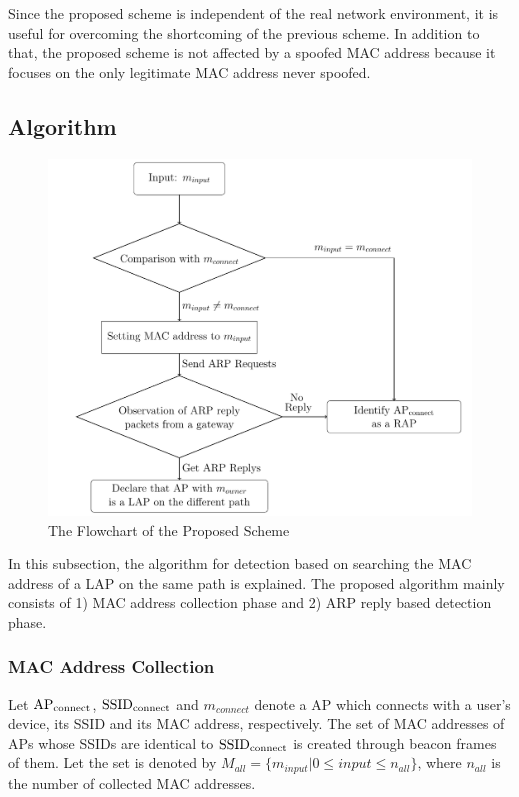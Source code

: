 \documentclass[conference]{IEEEtran}
\newcommand{\SSID}{\rm SSID_{connect}}
\newcommand{\tarAP}{\rm AP_{connect}}
\newcommand{\tarMAC}{m_{connect}}
\begin{document}
Since the proposed scheme is independent of the real network environment, it is useful for overcoming the shortcoming of the previous scheme.
In addition to that, the proposed scheme is not affected by a spoofed MAC address because it focuses on the only legitimate MAC address never spoofed.

\subsection{Algorithm} \label{sec:alg}
\begin{figure}[t]
    \begin{center}
        \includegraphics[scale=0.45]{flowchart/flowchart.pdf}
        \caption{The Flowchart of the Proposed Scheme}
        \label{fig:flowchart}
    \end{center}
\vspace{-2zh}
\end{figure}
In this subsection, the algorithm for detection based on searching the MAC address of a LAP on the same path is explained.
The proposed algorithm mainly consists of 1) MAC address collection phase and 2) ARP reply based detection phase. 

\subsubsection{MAC Address Collection}
Let $\tarAP$, $\SSID$ and $\tarMAC$ denote a AP which connects with a user's device, its SSID and its MAC address, respectively.
The set of MAC addresses of APs whose SSIDs are identical to $\SSID$  is created through beacon frames of them. 
Let the set is denoted by $M_{all}=\{m_{input}|0\le input \le n_{all}  \}$, where $n_{all}$ is the number of collected MAC addresses.
\end{document}
